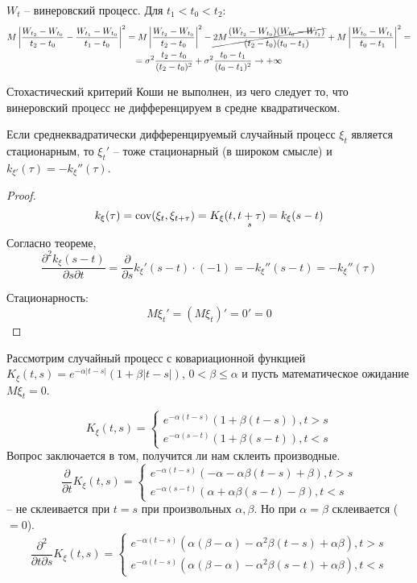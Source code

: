 \begin{ex}
  $W_t$ -- винеровский процесс. Для $t_1 < t_0 < t_2$:
  \begin{multline*}
    M\left| \dfrac{W_{t_2} - W_{t_0}}{t_2 - t_0} - \dfrac{W_{t_1} - W_{t_0}}{t_1 - t_0} \right|^2 
    = M \left| \dfrac{W_{t_2} - W_{t_0}}{t_2 - t_0} \right|^2 - \cancel{2 M \dfrac{(W_{t_2} - W_{t_0})(W_{t_0} - W_{t_1})}{(t_2 - t_0)(t_0-t_1)} } + M \left| \dfrac{W_{t_0} - W_{t_1}}{t_0 - t_1} \right|^2 = \\
    = \sigma^2 \dfrac{t_2-t_0}{(t_2-t_0)^2} + \sigma^2 \dfrac{t_0 - t_1}{(t_0-t_1)^2} \to +\infty
  \end{multline*}

  Стохастический критерий Коши не выполнен, из чего следует то, что винеровский процесс не дифференцируем в средне квадратическом.
\end{ex}

\begin{corollary}
  Если среднеквадратически дифференцируемый случайный процесс $\xi_t$ является стационарным,
то $\xi_t'$ -- тоже стационарный (в широком смысле) и $k_{\xi'} (\tau) = - k_\xi''(\tau)$.
\end{corollary}
\begin{proof}
  \[
    k_\xi (\tau) = \operatorname{cov}(\xi_t, \xi_{t+\tau}) = K_\xi(t, \underset{s}{t+\tau}) = k_\xi(s-t)
  \]
  Согласно теореме, 
  \[
    \dfrac{\partial^2 k_\xi(s-t)}{\partial s \partial t} = \dfrac{\partial }{\partial s} k_\xi'(s-t) \cdot (-1) = - k_\xi''(s-t) = - k_\xi''(\tau)
  \]

  Стационарность:
  \[
    M\xi_t' = (M\xi_t)' = 0' = 0
  \]
\end{proof}

\begin{ex}
  Рассмотрим случайный процесс с ковариационной функцией
  $K_\xi(t,s) = e^{-\alpha |t-s|} ( 1 + \beta|t-s| ) $, $ 0 < \beta \leqslant \alpha$
  и пусть математическое ожидание $M\xi_t = 0$.

  \[
    K_\xi(t,s) = \begin{cases}
      e^{-\alpha (t-s)} (1+\beta(t-s)), t > s \\
      e^{-\alpha (s - t)} (1+\beta(s-t)), t < s
    \end{cases}
  \]
  Вопрос заключается в том, получится ли нам склеить производные.
  \[
    \dfrac{\partial }{\partial t} K_\xi(t,s) = \begin{cases}
      e^{-\alpha (t-s)} ( - \alpha - \alpha \beta(t-s) + \beta), t > s \\
      e^{-\alpha (s - t)} (\alpha + \alpha \beta (s-t) - \beta), t < s
    \end{cases}
  \]
  -- не склеивается при $t = s$ при произвольных $\alpha, \beta$. Но при $\alpha = \beta$
  склеивается ($=0$).
  \[
    \dfrac{\partial^2 }{\partial t \partial s} K_\xi(t,s) = \begin{cases}
      e^{-\alpha (t-s)} (\alpha(\beta-\alpha)- \alpha^2 \beta(t-s) + \alpha\beta), t > s \\
      e^{-\alpha (t-s)} (\alpha(\beta-\alpha)- \alpha^2 \beta(s-t) + \alpha\beta), t < s
    \end{cases}
  \]
\end{ex}
